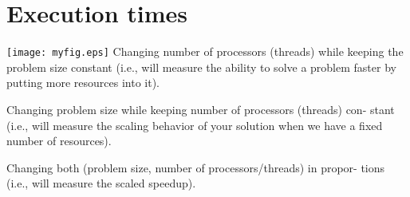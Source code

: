 \documentclass[a4paper]{article}
\begin{document}
\section{Execution times}
  \texttt{[image: myfig.eps]}
   Changing number of processors (threads) while keeping the problem size constant (i.e., will measure the ability to solve a problem faster by putting more resources into it).
   
  
  Changing problem size while keeping number of processors (threads) con- stant (i.e., will measure the scaling behavior of your solution when we have a fixed number of resources).
  
  
  Changing both (problem size, number of processors/threads) in propor- tions (i.e., will measure the scaled speedup).
\end{document}
